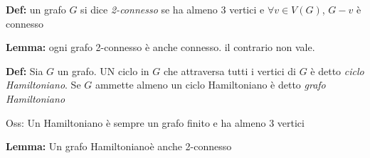 \documentclass[11pt, letterpaper]{article}
\begin{document}
\textbf{Def:} un grafo $G$ si dice \textit{2-connesso} se ha almeno 3 vertici e $\forall v\in V(G)$, $G-v$ è connesso

\textbf{Lemma:} ogni grafo 2-connesso è anche connesso. il contrario non vale.

\textbf{Def:} Sia $G$ un grafo. UN ciclo in $G$ che attraversa tutti i vertici di $G$ è detto \textit{ciclo 
Hamiltoniano}. Se $G$ ammette almeno un ciclo Hamiltoniano è  detto \textit{grafo Hamiltoniano}

Oss: Un Hamiltoniano è  sempre un grafo finito e ha almeno 3 vertici

\textbf{Lemma:} Un grafo Hamiltonianoè anche 2-connesso
\end{document}
